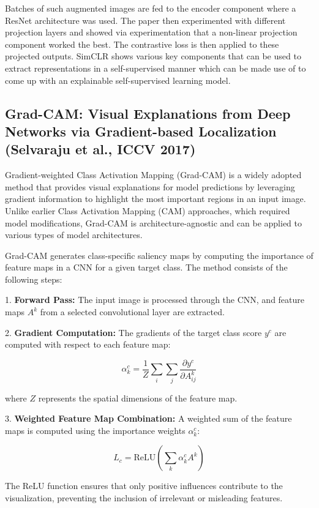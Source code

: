Batches of such augmented images are fed to the encoder component where a ResNet architecture was used. The paper then experimented with different projection layers and showed via experimentation that a non-linear projection component worked the best. The contrastive loss is then applied to these projected outputs. SimCLR shows various key components that can be used to extract representations in a self-supervised manner which can be made use of to come up with an explainable self-supervised learning model.

\subsection{Grad-CAM: Visual Explanations from Deep Networks via Gradient-based Localization (Selvaraju et al., ICCV 2017)}

Gradient-weighted Class Activation Mapping (Grad-CAM)\cite{Selvaraju_2017_ICCV} is a widely adopted method that provides visual explanations for model predictions by leveraging gradient information to highlight the most important regions in an input image. Unlike earlier Class Activation Mapping (CAM) approaches, which required model modifications, Grad-CAM is architecture-agnostic and can be applied to various types of model architectures.

Grad-CAM generates class-specific saliency maps by computing the importance of feature maps in a CNN for a given target class. The method consists of the following steps:

1. \textbf{Forward Pass:} The input image is processed through the CNN, and feature maps \(A^k\) from a selected convolutional layer are extracted.

2. \textbf{Gradient Computation:} The gradients of the target class score \(y^c\) are computed with respect to each feature map:

   $$
   \alpha_k^c = \frac{1}{Z} \sum_i \sum_j \frac{\partial y^c}{\partial A^k_{ij}}
   $$

   where \(Z\) represents the spatial dimensions of the feature map.

3. \textbf{Weighted Feature Map Combination:} A weighted sum of the feature maps is computed using the importance weights \(\alpha_k^c\):

   $$
   L_c = \text{ReLU} \left( \sum_k \alpha_k^c A^k \right)
   $$

   The ReLU function ensures that only positive influences contribute to the visualization, preventing the inclusion of irrelevant or misleading features.

